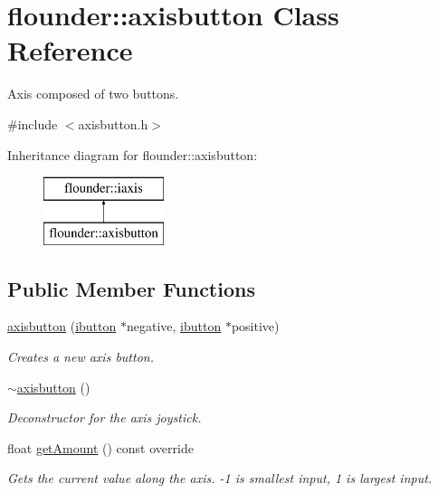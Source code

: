 \hypertarget{classflounder_1_1axisbutton}{}\section{flounder\+:\+:axisbutton Class Reference}
\label{classflounder_1_1axisbutton}


Axis composed of two buttons.  




{\ttfamily \#include $<$axisbutton.\+h$>$}

Inheritance diagram for flounder\+:\+:axisbutton\+:\begin{figure}[H]
\begin{center}
\leavevmode
\includegraphics[height=2.000000cm]{classflounder_1_1axisbutton}
\end{center}
\end{figure}
\subsection*{Public Member Functions}
\begin{DoxyCompactItemize}
\item 
\hyperlink{classflounder_1_1axisbutton_a0f02ecccceb4155637ff3380335a0c62}{axisbutton} (\hyperlink{classflounder_1_1ibutton}{ibutton} $\ast$negative, \hyperlink{classflounder_1_1ibutton}{ibutton} $\ast$positive)
\begin{DoxyCompactList}\small\item\em Creates a new axis button. \end{DoxyCompactList}\item 
\hyperlink{classflounder_1_1axisbutton_a39d7d5faaf65ff5bef2cbded008762a9}{$\sim$axisbutton} ()
\begin{DoxyCompactList}\small\item\em Deconstructor for the axis joystick. \end{DoxyCompactList}\item 
float \hyperlink{classflounder_1_1axisbutton_aa5589f11ec6a9f4e6d01727903581539}{get\+Amount} () const override
\begin{DoxyCompactList}\small\item\em Gets the current value along the axis. -\/1 is smallest input, 1 is largest input. \end{DoxyCompactList}\end{DoxyCompactItemize}
